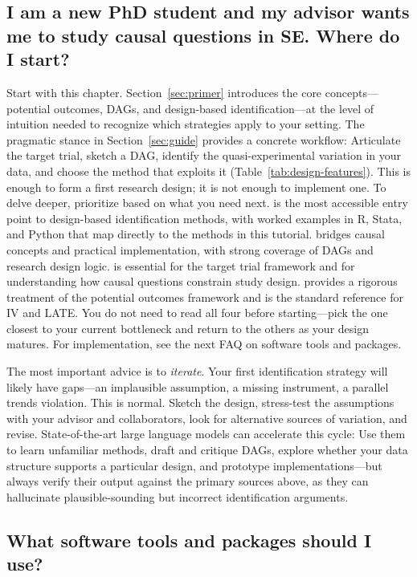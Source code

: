 \subsection{I am a new PhD student and my advisor wants me to study causal questions in SE. Where do I start?}

Start with this chapter.
Section~\ref{sec:primer} introduces the core concepts---potential outcomes, DAGs, and design-based identification---at the level of intuition needed to recognize which strategies apply to your setting.
The pragmatic stance in Section~\ref{sec:guide} provides a concrete workflow: Articulate the target trial, sketch a DAG, identify the quasi-experimental variation in your data, and choose the method that exploits it (Table~\ref{tab:design-features}).
This is enough to form a first research design; it is not enough to implement one.
To delve deeper, prioritize based on what you need next.
\citet{cunningham2021causal} is the most accessible entry point to design-based identification methods, with worked examples in R, Stata, and Python that map directly to the methods in this tutorial.
\citet{huntingtonklein2021effect} bridges causal concepts and practical implementation, with strong coverage of DAGs and research design logic.
\citet{hernan2020causal} is essential for the target trial framework and for understanding how causal questions constrain study design.
\citet{angrist2009mostly} provides a rigorous treatment of the potential outcomes framework and is the standard reference for IV and LATE.
You do not need to read all four before starting---pick the one closest to your current bottleneck and return to the others as your design matures.
For implementation, see the next FAQ on software tools and packages.

The most important advice is to \emph{iterate}.
Your first identification strategy will likely have gaps---an implausible assumption, a missing instrument, a parallel trends violation.
This is normal.
Sketch the design, stress-test the assumptions with your advisor and collaborators, look for alternative sources of variation, and revise.
State-of-the-art large language models can accelerate this cycle: Use them to learn unfamiliar methods, draft and critique DAGs, explore whether your data structure supports a particular design, and prototype implementations---but always verify their output against the primary sources above, as they can hallucinate plausible-sounding but incorrect identification arguments.

\subsection{What software tools and packages should I use?}

